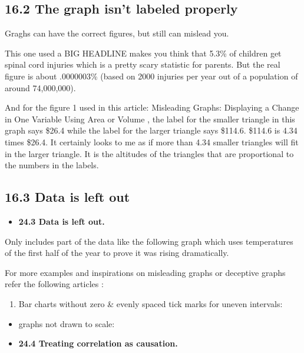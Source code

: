 \documentclass[]{book}
\providecommand{\tightlist}{%
  \setlength{\itemsep}{0pt}\setlength{\parskip}{0pt}}
\theoremstyle{definition}
\theoremstyle{definition}
\theoremstyle{definition}
\theoremstyle{remark}
\begin{document}
\subsection{16.2 The graph isn't labeled
properly}\label{the-graph-isnt-labeled-properly}

Graghs can have the correct figures, but still can mislead you.

This one used a BIG HEADLINE makes you think that 5.3\% of children get
spinal cord injuries which is a pretty scary statistic for parents. But
the real figure is about .0000003\% (based on 2000 injuries per year out
of a population of around 74,000,000).

And for the figure 1 used in this article: Misleading Graphs: Displaying
a Change in One Variable Using Area or Volume \citep{scaling_issues},
the label for the smaller triangle in this graph says \$26.4 while the
label for the larger triangle says \$114.6. \$114.6 is 4.34 times
\$26.4. It certainly looks to me as if more than 4.34 smaller triangles
will fit in the larger triangle. It is the altitudes of the triangles
that are proportional to the numbers in the labels.

\subsection{16.3 Data is left out}\label{data-is-left-out}

\begin{itemize}
\tightlist
\item
  \textbf{24.3 Data is left out.}
\end{itemize}

Only includes part of the data like the following graph which uses
temperatures of the first half of the year to prove it was rising
dramatically.

For more examples and inspirations on misleading graphs or deceptive
graphs refer the following articles :

\begin{enumerate}
\def\labelenumi{\alph{enumi})}
\tightlist
\item
  Bar charts without zero \& evenly spaced tick marks for uneven
  intervals: \citep{whats_wrong}
\end{enumerate}

\begin{itemize}
\item
  graphs not drawn to scale: \citep{scaling_issues}
\item
  \textbf{24.4 Treating correlation as causation.}
\end{itemize}
\end{document}
